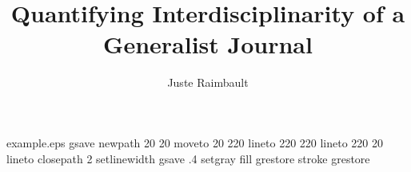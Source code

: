 %
%
%
%
%
\begin{filecontents*}{example.eps}
gsave
newpath
  20 20 moveto
  20 220 lineto
  220 220 lineto
  220 20 lineto
closepath
2 setlinewidth
gsave
  .4 setgray fill
grestore
stroke
grestore
\end{filecontents*}
%
\RequirePackage{fix-cm}
%
\documentclass[smallextended]{svjour3}       %
%
\smartqed  %
%
\usepackage{graphicx}
%
%
%
%
%


\title{Quantifying Interdisciplinarity of a Generalist Journal
}


\author{Juste Raimbault}




